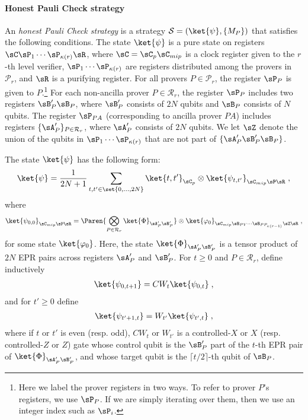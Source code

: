 \paragraph{Honest Pauli Check strategy}
An \emph{honest Pauli Check strategy} is a strategy $\mathcal{S} = (\ket{\psi},\{ M_P \})$ that satisfies the following conditions. The state $\ket{\psi}$ is a pure state on registers $\sC \sP_1 \cdots \sP_{\kappa(r)} \sR$, where $\sC = \sC_p \sC_{mip}$ is a clock register given to the $r$-th level verifier, $\sP_1 \cdots \sP_{\kappa(r)}$ are registers distributed among the provers in $\mathcal{P}_r$, and $\sR$ is a purifying register. For all provers $P \in \mathcal{P}_r$, the register $\sP_P$ is given to $P$.\footnote{Here we label the prover registers in two ways. To refer to prover $P$'s registers, we use $\sP_P$. If we are simply iterating over them, then we use an integer index such as $\sP_i$.}  For each non-ancilla prover $P \in \mathcal{R}_r$, the register $\sP_P$ includes two registers $\sB'_P \sB_P$, where $\sB'_P$ consists of $2N$ qubits and $\sB_P$ consists of $N$ qubits. The register $\sP_{PA}$ (corresponding to ancilla prover $PA$) includes registers $\{ \sA_P' \}_{P \in \mathcal{R}_r}$, where $\sA_P'$ consists of $2N$ qubits. We let $\sZ$ denote the union of the qubits in $\sP_1 \cdots \sP_{\kappa(r)}$ that are not part of $\{ \sA_P' \sB_P' \sB_P \}$. 

The state $\ket{\psi}$ has the following form:
\begin{equation}
	\ket{\psi} = \frac{1}{2N+1} \sum_{ t,t' \in \set{0,\ldots,2N} } \ket{t,t'}_{\sC_p} \otimes \ket{\psi_{t,t'}}_{\sC_{mip} \sP \sR}\;,
	\label{eq:honest-psi}
\end{equation}
where 
\[
	\ket{\psi_{0,0}}_{\sC_{mip} \sP \sR} = \Paren{ \bigotimes_{P \in \mathcal{R}_r} \ket{\Phi}_{\sA_P' \sB_P'}} \otimes \ket{\varphi_0}_{\sC_{mip} \sB_{PV} \cdots \sB_{PP_{\kappa(r-1)}} \sZ \sR}\;,
\]
for some state $\ket{\varphi_0}$. Here, the state $\ket{\Phi}_{\sA_P' \sB_P'}$ is a tensor product of $2N$ EPR pairs across registers $\sA_P'$ and $\sB_P'$. For $t\geq 0$ and 
$P \in \mathcal{R}_r$, define inductively
\begin{align}
	\ket{\psi_{0,t+1}} =  CW_t \ket{\psi_{0,t}} \;,
\end{align}
and for $t' \geq 0$ define 
\begin{align}
	\ket{\psi_{t'+1,t}} =  W_{t'} \ket{\psi_{t',t}} \;,
\end{align}
where if $t$ or $t'$ is even (resp. odd), $CW_t$ or $W_{t'}$ is a controlled-$X$ or $X$ (resp. controlled-$Z$ or $Z$) gate whose control qubit is the $\sB_P'$ part of the $t$-th EPR pair of $\ket{\Phi}_{\sA_P' \sB_P'}$, and whose target qubit is the $\lceil t/2\rceil$-th qubit of $\sB_P$. 


